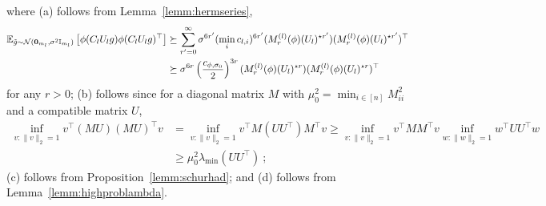 where (a) follows from Lemma~\ref{lemm:hermseries},
\begin{align*}
\mathbb{E}_{\tilde{g} \sim {\cal N}(\bm{0}_{m_l},\sigma^2 \mathbb{I}_{m_l})}\left[ \phi(C_l U_l g) \phi(C_l U_l g)^\top \right] &\succeq \sum_{r'=0}^{\infty}  \sigma^{6r'} (\min_i c_{l,i})^{6r'} (M_r^{(l)}(\phi) (U_l)^{\star r'}) (M_r^{(l)}(\phi) (U_l)^{\star r'})^\top\\
&\succeq 
\sigma^{6r} \left(\frac{c_{\phi,\sigma_0}}{2}\right)^{3r} (M_r^{(l)}(\phi) (U_l)^{\star r}) (M_r^{(l)}(\phi) (U_l)^{\star r})^\top
\end{align*}
for any $r>0$; (b) follows since for a diagonal matrix $M$ with $\mu_0^2 = \min_{i \in [n]} M^2_{ii}$ and a compatible matrix $U$,  
\begin{align*}
\inf_{v : \|v \|_2=1} v^\top (M U) (MU)^\top v & = \inf_{v : \|v \|_2=1} v^\top M (U U^\top) M^\top v \geq \inf_{v : \|v \|_2=1} v^\top M M^\top v  \inf_{w : \|w \|_2=1} w^\top U U^\top w \\
& \geq \mu_0^2 \lambda_{\min}(UU^\top)~;
\end{align*}
(c) follows from Proposition~\ref{lemm:schurhad}; and (d) follows from Lemma~\ref{lemm:highproblambda}.


